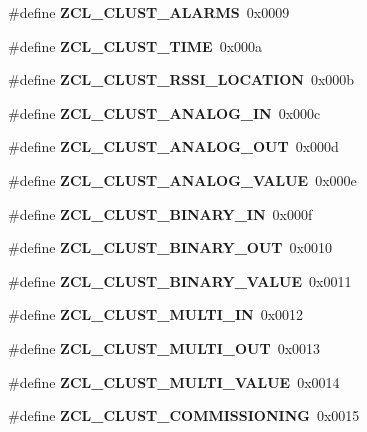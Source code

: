 \begin{DoxyCompactItemize}
\#define {\bfseries Z\+C\+L\+\_\+\+C\+L\+U\+S\+T\+\_\+\+A\+L\+A\+R\+MS}~0x0009
\item 
\mbox{\label{group__zcl_gaf21f5b2c5bed64debf5d817a65d83d69}} 
\#define {\bfseries Z\+C\+L\+\_\+\+C\+L\+U\+S\+T\+\_\+\+T\+I\+ME}~0x000a
\item 
\mbox{\label{group__zcl_gac13b2895b15d1293afb359996709e638}} 
\#define {\bfseries Z\+C\+L\+\_\+\+C\+L\+U\+S\+T\+\_\+\+R\+S\+S\+I\+\_\+\+L\+O\+C\+A\+T\+I\+ON}~0x000b
\item 
\mbox{\label{group__zcl_ga2b4fbabe7511a86fae352f564bed3012}} 
\#define {\bfseries Z\+C\+L\+\_\+\+C\+L\+U\+S\+T\+\_\+\+A\+N\+A\+L\+O\+G\+\_\+\+IN}~0x000c
\item 
\mbox{\label{group__zcl_gad3a725684cb791e5a9c0e84d8549bb6a}} 
\#define {\bfseries Z\+C\+L\+\_\+\+C\+L\+U\+S\+T\+\_\+\+A\+N\+A\+L\+O\+G\+\_\+\+O\+UT}~0x000d
\item 
\mbox{\label{group__zcl_gabece8a12cc79a662e518016d3b1378b5}} 
\#define {\bfseries Z\+C\+L\+\_\+\+C\+L\+U\+S\+T\+\_\+\+A\+N\+A\+L\+O\+G\+\_\+\+V\+A\+L\+UE}~0x000e
\item 
\mbox{\label{group__zcl_ga54bc6473ba454f3f84251bd37a2d1dc5}} 
\#define {\bfseries Z\+C\+L\+\_\+\+C\+L\+U\+S\+T\+\_\+\+B\+I\+N\+A\+R\+Y\+\_\+\+IN}~0x000f
\item 
\mbox{\label{group__zcl_gab553808690d6f12100305f090909e501}} 
\#define {\bfseries Z\+C\+L\+\_\+\+C\+L\+U\+S\+T\+\_\+\+B\+I\+N\+A\+R\+Y\+\_\+\+O\+UT}~0x0010
\item 
\mbox{\label{group__zcl_ga8b482af4088fea7de7a3ff70dfd6cdb6}} 
\#define {\bfseries Z\+C\+L\+\_\+\+C\+L\+U\+S\+T\+\_\+\+B\+I\+N\+A\+R\+Y\+\_\+\+V\+A\+L\+UE}~0x0011
\item 
\mbox{\label{group__zcl_ga0c54d0abb514bdb233c389d6608bb6f7}} 
\#define {\bfseries Z\+C\+L\+\_\+\+C\+L\+U\+S\+T\+\_\+\+M\+U\+L\+T\+I\+\_\+\+IN}~0x0012
\item 
\mbox{\label{group__zcl_ga9dbb3e0eb48f6d263eb57ed8a3c8343a}} 
\#define {\bfseries Z\+C\+L\+\_\+\+C\+L\+U\+S\+T\+\_\+\+M\+U\+L\+T\+I\+\_\+\+O\+UT}~0x0013
\item 
\mbox{\label{group__zcl_gaeeda9501abc7a193da0708cbbb08cc84}} 
\#define {\bfseries Z\+C\+L\+\_\+\+C\+L\+U\+S\+T\+\_\+\+M\+U\+L\+T\+I\+\_\+\+V\+A\+L\+UE}~0x0014
\item 
\mbox{\label{group__zcl_ga547cd138961d72d75ec09224e7777ed7}} 
\#define {\bfseries Z\+C\+L\+\_\+\+C\+L\+U\+S\+T\+\_\+\+C\+O\+M\+M\+I\+S\+S\+I\+O\+N\+I\+NG}~0x0015
\end{DoxyCompactItemize}
